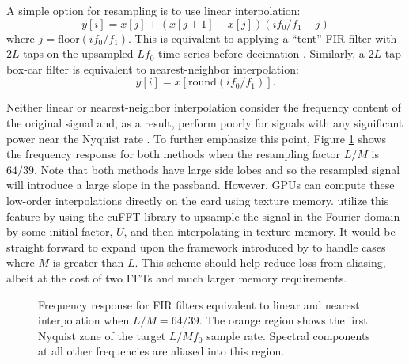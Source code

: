 \documentclass[11pt,preprint]{aastex}
\begin{document}

A simple option for resampling is to use linear interpolation:
\begin{equation}
y[i] = x[j] + (x[j+1] - x[j]) (if_0/f_1 - j)
\end{equation}
where $j = \mathrm{floor}(if_0/f_1)$.  This is equivalent to applying a ``tent'' FIR filter with $2L$ taps on the 
upsampled $Lf_0$ time series before decimation \citep{oppenheim10}.  Similarly, a $2L$ tap box-car filter is 
equivalent to nearest-neighbor interpolation:
\begin{equation}
y[i] = x[\mathrm{round}(if_0/f_1)].
\end{equation}

Neither linear or nearest-neighbor interpolation consider the frequency content of the original signal and, as a 
result, perform poorly for signals with any significant power near the Nyquist rate \citep{fraser89}.  To further 
emphasize this point, Figure 
\ref{fig:windows} shows the frequency response for both methods when 
the resampling factor $L/M$ is $64/39$.  Note that both methods have large side lobes and so the 
resampled signal will introduce a large slope in the passband.  However, GPUs can compute 
these low-order interpolations directly on the card using texture memory.  \citet{kim14b} utilize this feature 
by using the cuFFT library to upsample the signal in the Fourier domain by some initial factor, $U$, and then 
interpolating in texture memory.  It would be straight forward to 
expand upon the framework introduced by \citet{kim14b} to handle cases where $M$ is greater than $L$.  
This scheme should help reduce loss from aliasing, albeit 
at the cost of two FFTs and much larger memory requirements.

\begin{figure}[H!]
\caption{Frequency response for FIR filters equivalent to linear and nearest interpolation when $L/M = 64/39$.
The orange region shows the first Nyquist zone of the target $L/Mf_0$ sample rate.  Spectral components at all 
other frequencies are aliased into this region.}
\label{fig:windows}
\end{figure}
 
\end{document}
